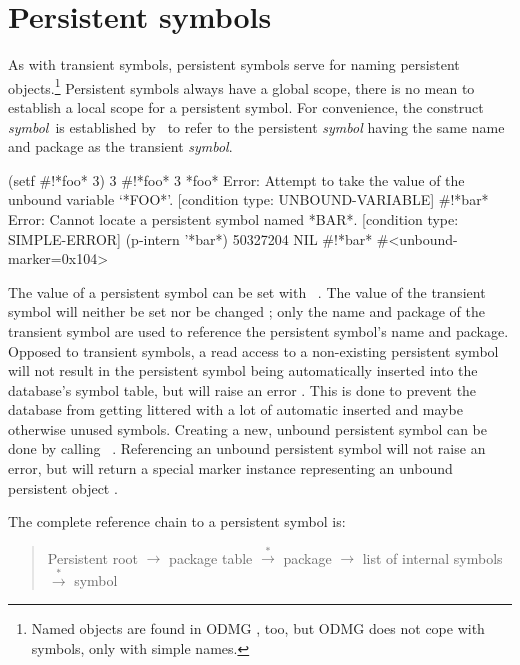 \section{Persistent symbols}%
\label{sec:PersistentSymbol}

As with transient symbols, persistent symbols serve for naming
persistent objects.\footnote{Named objects are found in ODMG
  \cite[, \textbf{bind()} method]{bib:ODMG-2}, too, but
  ODMG does not cope with symbols, only with simple names.} Persistent
symbols always have a global scope, there is no mean to establish a
local scope for a persistent symbol. For convenience, the construct
\lisp{\#!}\emph{\lt{}symbol\gt}\ is established by \plob\ to refer to
the persistent \emph{\lt{}symbol\gt} having the same name and package
as the transient \emph{\lt{}symbol\gt}.
\begin{IndentedCompactCode}
\listener{}(setf #!*foo* 3)\marginnumber{\smalloi}
3
\listener{}#!*foo*
3
\listener{}*foo*\marginnumber{\smalloii}
Error: Attempt to take the value of the unbound variable `*FOO*'.
  [condition type: UNBOUND-VARIABLE]
\OmitUnimportant
\listener{}#!*bar*\marginnumber{\smalloiii}
Error: Cannot locate a persistent symbol named *BAR*.
  [condition type: SIMPLE-ERROR]
\OmitUnimportant
\listener{}(p-intern '*bar*)\marginnumber{\smalloiv}
50327204        
NIL             
\listener{}#!*bar*\marginnumber{\smallov}
#<unbound-marker=0x104>
\end{IndentedCompactCode}

The value of a persistent symbol can be set with \ \oi.
The value of the transient symbol will neither be set
nor be changed \oii; only the name and package of the transient symbol
are used to reference the persistent symbol's name and package.
Opposed to transient symbols, a read access to a non-existing
persistent symbol will not result in the persistent symbol being
automatically inserted into the database's symbol table, but will
raise an error \oiii.  This is done to prevent the database from
getting littered with a lot of automatic inserted and maybe otherwise
unused symbols.  Creating a new, unbound persistent symbol can be done
by calling \ \oiv. Referencing an unbound persistent
symbol will not raise an error, but will return a special marker
instance representing an unbound persistent object \ov.

The complete reference chain to a persistent symbol is:
\begin{quote}
  Persistent root $\rightarrow$ package table
  $\stackrel{*}{\rightarrow}$ package $\rightarrow$ list of internal
  symbols $\stackrel{*}{\rightarrow}$ symbol
\end{quote}

